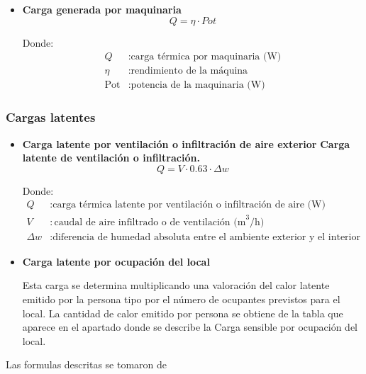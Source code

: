 \begin{itemize}
\begin{itemize}
	Se considerará que las pérdidas de la maquinaria se transforman íntegramente en calor sensible.	
\item \textbf{Carga generada por maquinaria} 
	\begin{equation} \label{eq:carga_maquinaria}
		Q = \eta \cdot {Pot}
	\end{equation}
	
	 {Donde:}
	\begin{align*}
		Q & : \text{carga térmica por maquinaria (W)} \\
		\eta & : \text{rendimiento de la máquina} \\
		\text{Pot} & : \text{potencia de la maquinaria (W)}
	\end{align*}
\end{itemize}
\subsubsection{Cargas latentes}
\begin{itemize}
	
	\item \textbf{Carga latente por ventilación o infiltración de aire exterior}
	\textbf{Carga latente de ventilación o infiltración.}
	\begin{equation} \label{eq:carga_latente_ventilacion}
		Q = V \cdot 0.63 \cdot \Delta w
	\end{equation}
	
	 {Donde:}
	\begin{align*}
		Q & : \text{carga térmica latente por ventilación o infiltración de aire (W)} \\
		V & : \text{caudal de aire infiltrado o de ventilación (m}^3/\text{h)} \\
		\Delta w & : \text{diferencia de humedad absoluta entre el ambiente exterior y el interior (ºC)}
	\end{align*}
	
\item \textbf{Carga latente por ocupación del local}
	
	Esta carga se determina multiplicando una valoración del calor latente emitido por la persona tipo por el número de ocupantes previstos para el local. La cantidad de calor emitido por persona se obtiene de la tabla que aparece en el apartado donde se describe la Carga sensible por ocupación del local.
	
\end{itemize}
Las formulas descritas se tomaron de \cite{bruno-2024,carrier-1980,sampp-2023}\rsp
\end{itemize}
